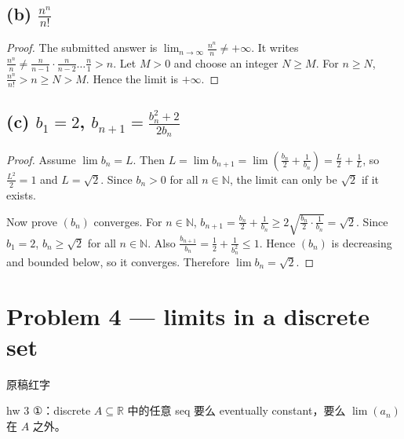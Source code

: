 \subsection{\texorpdfstring{(b) \(\frac{n^{n}}{n!}\)}{(b) \textbackslash frac\{n\^{}\{n\}\}\{n!\}}}

\begin{proof}

The submitted answer is \(\lim_{n\rightarrow\infty}\frac{n^{n}}{n} \neq + \infty\). It writes \(\frac{n^{n}}{n} \neq \frac{n}{n - 1} \cdot \frac{n}{n - 2}\ldots\frac{n}{1} > n\). Let \(M > 0\) and choose an integer \(N \geq M\). For \(n \geq N\), \(\frac{n^{n}}{n!} > n \geq N > M\). Hence the limit is \(+ \infty\).

\end{proof}

\subsection{\texorpdfstring{(c) \(b_{1} = 2\), \(b_{n + 1} = \frac{b_{n}^{2} + 2}{2b_{n}}\)}{(c) b\_\{1\} = 2, b\_\{n + 1\} = \textbackslash frac\{b\_\{n\}\^{}\{2\} + 2\}\{2b\_\{n\}\}}}

\begin{proof}

Assume \(\lim b_{n} = L\). Then \(L = \lim b_{n + 1} = \lim\left( {\frac{b_{n}}{2} + \frac{1}{b_{n}}} \right) = \frac{L}{2} + \frac{1}{L}\), so \(\frac{L^{2}}{2} = 1\) and \(L = \sqrt{2}\). Since \(b_{n} > 0\) for all \(n \in \mathbb{N}\), the limit can only be \(\sqrt{2}\) if it exists.

Now prove \(\left( b_{n} \right)\) converges. For \(n \in \mathbb{N}\), \(b_{n + 1} = \frac{b_{n}}{2} + \frac{1}{b_{n}} \geq 2\sqrt{\frac{b_{n}}{2} \cdot \frac{1}{b_{n}}} = \sqrt{2}\). Since \(b_{1} = 2\), \(b_{n} \geq \sqrt{2}\) for all \(n \in \mathbb{N}\). Also \(\frac{b_{n + 1}}{b_{n}} = \frac{1}{2} + \frac{1}{b_{n}^{2}} \leq 1\). Hence \(\left( b_{n} \right)\) is decreasing and bounded below, so it converges. Therefore \(\lim b_{n} = \sqrt{2}\).

\end{proof}

\section{Problem 4 --- limits in a discrete set}

\begin{qlnote}{原稿红字}

hw 3 ①：discrete \(A \subseteq \mathbb{R}\) 中的任意 seq 要么 eventually constant，要么 \(\lim\left( a_{n} \right)\) 在 \(A\) 之外。

\end{qlnote}

